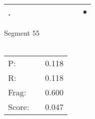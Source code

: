 \documentclass[landscape]{article}
\newcommand{\ssp}{\hspace{2pt}}
\newcommand{\mex}{\cellcolor{g}$\bullet$}
\begin{document}
\begin{tabular}{|l|p{10pt}|p{10pt}|p{10pt}|p{10pt}|p{10pt}|p{10pt}|p{10pt}|p{10pt}|p{10pt}|}
\hline
\ssp \cellcolor{ref8}. \ssp&\hspace{2pt}&\hspace{2pt}&\hspace{2pt}&\hspace{2pt}&\hspace{2pt}&\hspace{2pt}&\hspace{2pt}&\hspace{2pt}&\hspace{2pt}\mex\\
\hline
\end{tabular}

\vspace{6pt}
\noindent Segment 55\\\\
\noindent\begin{tabular}{lm{12pt}r}
\hline
P:&&0.118\\
R:&&0.118\\
Frag:&&0.600\\
Score:&&0.047\\
\end{tabular}

\newpage
\end{document}
